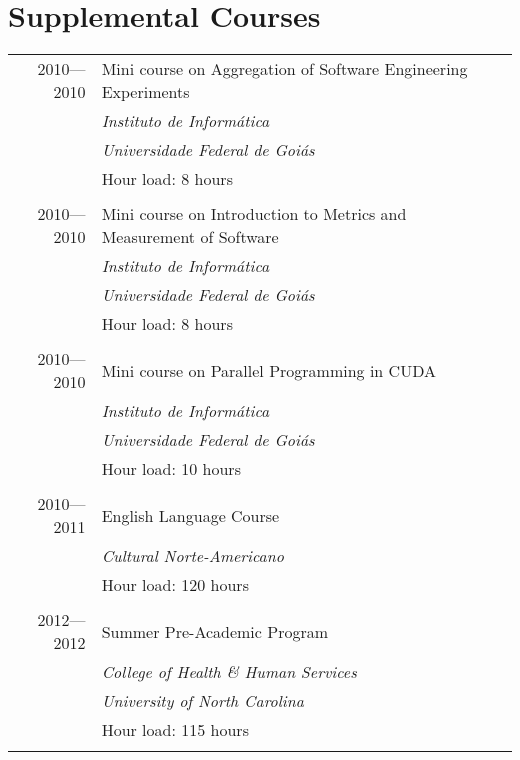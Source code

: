 \documentclass[a4paper,10pt]{article}
\begin{document}
\section{Supplemental Courses}
\begin{tabular}{r|p{11cm}}
  \textsc{2010---2010} & Mini course on Aggregation of Software Engineering Experiments\\ &
  \emph{Instituto de Informática} \\ &
  \emph{Universidade Federal de Goiás}\\ &
  Hour load: 8 hours
  \\\multicolumn{2}{c}{} \\

  \textsc{2010---2010} & Mini course on Introduction to Metrics and Measurement of Software\\ &
  \emph{Instituto de Informática} \\ &
  \emph{Universidade Federal de Goiás}\\ &
  Hour load: 8 hours
  \\\multicolumn{2}{c}{} \\

  \textsc{2010---2010} & Mini course on Parallel Programming in CUDA\\ &
  \emph{Instituto de Informática} \\ &
  \emph{Universidade Federal de Goiás}\\ &
  Hour load: 10 hours
  \\\multicolumn{2}{c}{} \\

  \textsc{2010---2011} & English Language Course\\ &
  \emph{Cultural Norte-Americano} \\ &
  Hour load: 120 hours
  \\\multicolumn{2}{c}{} \\

  \textsc{2012---2012} & Summer Pre-Academic Program\\ &
  \emph{College of Health \& Human Services}\\ &
  \emph{University of North Carolina}\\ &
  Hour load: 115 hours
  \\\multicolumn{2}{c}{} \\
\end{tabular}

\pagebreak
\end{document}
